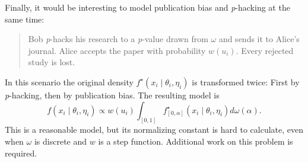\documentclass[useAMS,usenatbib,referee]{biom}
\begin{document}
Finally, it would be interesting to model publication bias and \textit{p}-hacking at the same time:
\begin{quote}
Bob \textit{p}-hacks his research to a \textit{p}-value drawn from $\omega$ and sends it to Alice's journal. Alice accepts the paper with probability $w(u_i)$. Every rejected study is lost.
\end{quote}
In this scenario the original density $f^{\star}(x_{i}\mid\theta_{i},\eta_{i})$ is transformed twice: First by \textit{p}-hacking, then by publication bias. The resulting model is
$$
f(x_{i}\mid\theta_{i},\eta_{i})\propto w(u_i)\int_{[0,1]}f_{[0,\alpha]}^{\star}(x_{i}\mid\theta_{i},\eta_{i})d\omega(\alpha).
$$
This is a reasonable model, but its normalizing constant is hard to calculate, even when $\omega$ is discrete and $w$ is a step function. Additional work on this problem is required.




\label{lastpage}
\end{document}

